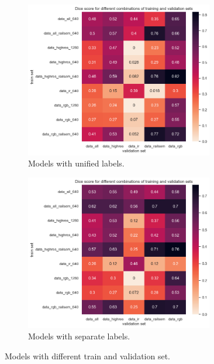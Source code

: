 \documentclass[Master,MDS,english]{BASE/twbook} %
\begin{document}
\begin{figure}
\centering
\begin{subfigure}[t]{.5\textwidth}
  \centering
  \includegraphics[width=0.9\textwidth]{images/yolo/models}
  \caption{Models with unified labels.}
\end{subfigure}%
\begin{subfigure}[t]{.5\textwidth}
  \centering
  \includegraphics[width=0.9\textwidth]{images/yolo/models_new_label}
  \caption{Models with separate labels. }
\end{subfigure}
\caption{Models with different train and validation set.}
\label{fig:yolo_models1}
\end{figure}
\end{document}
